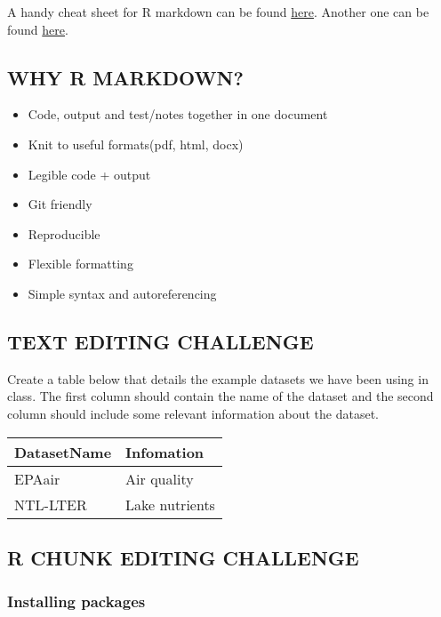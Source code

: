 \documentclass[]{article}
\providecommand{\tightlist}{%
  \setlength{\itemsep}{0pt}\setlength{\parskip}{0pt}}
\begin{document}
A handy cheat sheet for R markdown can be found
\href{https://www.rstudio.com/wp-content/uploads/2015/03/rmarkdown-reference.pdf}{here}.
Another one can be found
\href{https://www.rstudio.com/wp-content/uploads/2015/02/rmarkdown-cheatsheet.pdf}{here}.

\subsection{WHY R MARKDOWN?}\label{why-r-markdown}

\begin{itemize}
\tightlist
\item
  Code, output and test/notes together in one document
\item
  Knit to useful formats(pdf, html, docx)
\item
  Legible code + output
\item
  Git friendly
\item
  Reproducible
\item
  Flexible formatting
\item
  Simple syntax and autoreferencing
\end{itemize}

\subsection{TEXT EDITING CHALLENGE}\label{text-editing-challenge}

Create a table below that details the example datasets we have been
using in class. The first column should contain the name of the dataset
and the second column should include some relevant information about the
dataset.

\begin{longtable}[]{@{}ll@{}}
\toprule
DatasetName & Infomation\tabularnewline
\midrule
\endhead
EPAair & Air quality\tabularnewline
NTL-LTER & Lake nutrients\tabularnewline
\bottomrule
\end{longtable}

\subsection{R CHUNK EDITING CHALLENGE}\label{r-chunk-editing-challenge}

\subsubsection{Installing packages}\label{installing-packages}
\end{document}
